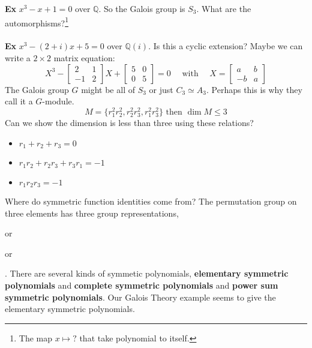 \documentclass[12pt]{article}
\begin{document}
\noindent \textbf{Ex} $x^3 - x + 1 = 0 $ over $\mathbb{Q}$.  So the Galois group is $S_3$.  What are the automorphisms?\footnote{The map $x \mapsto ?$ that take polynomial to itself.} \\ \\
\noindent \textbf{Ex} $x^3 - (2+i)x + 5 = 0$ over $\mathbb{Q}(i)$.  Is this a cyclic extension?  Maybe we can write a $2 \times 2$ matrix equation:
$$ X^3 - \left[ \begin{array}{rr} 2 & 1 \\ -1 & 2\end{array} \right] X  +  \left[ \begin{array}{rr} 5 & 0 \\ 0 & 5\end{array} \right] = 0 \quad\text{ with }\quad X = 
\left[ \begin{array}{rr} a & b \\ -b & a\end{array} \right]$$
The Galois group $G$ might be all of $S_3$ or just $C_3 \simeq A_3$.  Perhaps this is why they call it a $G$-module.  
$$ M = \{ r_1^2 r_2^2 , r_2^2 r_3^2, r_1^2 r_3^2 \} \text{ then } \dim M \leq 3 $$
Can we show the dimension is less than three using these relations?  
\begin{itemize}
\item $r_1 + r_2 + r_3 = 0$
\item $r_1 r_2 + r_2 r_3 + r_3 r_1 = -1$
\item $r_1 r_2 r_3 = -1$
\end{itemize}
Where do symmetric function identities come from?  The permutation group on three elements has three group representations, 
 or 
 or
 .  There are several kinds of symmetic polynomials, \textbf{elementary symmetric polynomials}  and \textbf{complete symmetric polynomials} and \textbf{power sum symmetric polynomials}.  Our Galois Theory example seems to give the elementary symmetric polynomials.
\end{document}
